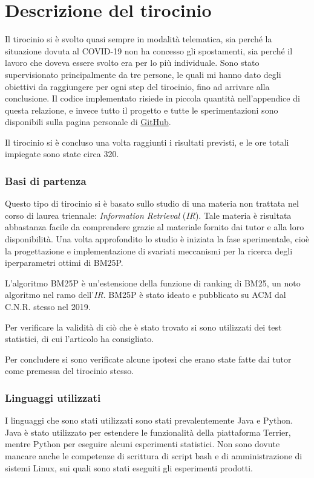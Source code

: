 \chapter{Descrizione del tirocinio}

Il tirocinio si è svolto quasi sempre in modalità telematica,
sia perché la situazione dovuta al COVID-19 non ha concesso
gli spostamenti, sia perché  il lavoro che doveva essere svolto
era per lo più individuale.
Sono stato supervisionato principalmente da tre persone,
le quali mi hanno dato degli obiettivi da raggiungere per ogni
step del tirocinio,
fino ad arrivare alla conclusione.
Il codice implementato risiede in piccola
quantità nell'appendice di questa relazione,
e invece tutto il progetto e tutte le sperimentazioni
sono disponibili sulla pagina personale di \href{https://github.com/federicosilvestri/bm25p-thesis}{GitHub}.

Il tirocinio si è concluso una volta raggiunti i risultati
previsti, e le ore totali impiegate sono state circa 320.

\subsection{Basi di partenza}
Questo tipo di tirocinio si è basato
sullo studio di una materia non trattata nel corso di laurea triennale:
\textit{Information Retrieval} (\textit{IR}).
Tale materia è risultata abbastanza facile da comprendere grazie
al materiale fornito dai tutor e alla loro disponibilità.
Una volta approfondito lo studio è iniziata la fase sperimentale,
cioè la progettazione e implementazione di svariati meccanismi per la ricerca 
degli iperparametri ottimi di BM25P.

L'algoritmo BM25P è un'estensione della funzione di ranking
di BM25, un noto algoritmo nel ramo dell'\textit{IR}.
BM25P è stato ideato e pubblicato su ACM dal C.N.R.
stesso nel 2019.\cite{10.1145/3331184.3331373}

Per verificare la validità di ciò che è stato trovato
si sono utilizzati dei test statistici, di cui l'articolo\cite{10.1145/1321440.1321528}
ha consigliato.

Per concludere si sono verificate alcune ipotesi
che erano state fatte dai tutor come premessa
del tirocinio stesso.

\subsection{Linguaggi utilizzati}
I linguaggi che sono stati utilizzati sono stati prevalentemente Java e Python.
Java è stato utilizzato per estendere le funzionalità della piattaforma Terrier,
mentre Python per eseguire alcuni esperimenti statistici.
Non sono dovute mancare anche le competenze di scrittura di script
bash e di amministrazione di sistemi Linux, sui quali sono stati
eseguiti gli esperimenti prodotti.

